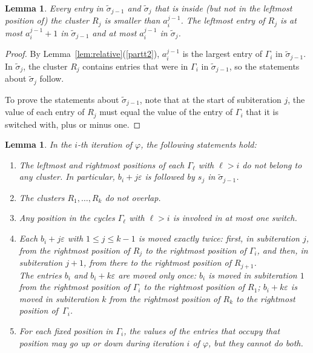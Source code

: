 \documentclass[11pt]{amsart}
\newtheorem{lemma}[theorem]{Lemma}
\newcommand\ben{\begin{enumerate}}
\newcommand\een{\end{enumerate}}
\newcommand\wt{\widetilde}
\newcommand\bij{\varphi}
\newcommand\eps{\varepsilon}
\newcommand\sigm{\wt\sigma}
\begin{document}
\begin{lemma}\label{lem:smaller}
Every entry in $\sigm_{j-1}$ and $\sigm_j$ that is inside (but not in the leftmost position of) the cluster $R_j$ is smaller than $a_i^{j-1}$.
The leftmost entry of $R_j$ is at most $a_i^{j-1}+1$ in $\sigm_{j-1}$ and at most $a_i^{j-1}$ in $\sigm_j$.
\end{lemma}

\begin{proof}
By Lemma~\ref{lem:relative}(\ref{partt2}), $a_i^{j-1}$ is the largest entry of $\Gamma_i$ in $\sigm_{j-1}$. In $\sigm_j$, the cluster $R_j$ contains entries that were
in $\Gamma_i$ in $\sigm_{j-1}$, so the statements about $\sigm_j$ follow.

To prove the statements about $\sigm_{j-1}$, note that at the start of subiteration $j$,
the value of each entry of $R_j$ must equal the value of the entry of $\Gamma_i$ that it is switched with, plus or minus one.
\end{proof}


\begin{lemma}\label{lem:clusters}
In the $i$-th iteration of $\bij$, the following statements hold:
\ben
\item\label{pd} The leftmost and rightmost positions of each $\Gamma_\ell$ with $\ell>i$ do not belong to any cluster. In particular, $b_i+j\eps$ is followed by $s_j$ in $\sigm_{j-1}$.
\item\label{pa} The clusters $R_1,\dots,R_k$ do not overlap.
\item\label{pb} Any position in the cycles $\Gamma_\ell$ with $\ell>i$ is involved in at most one switch.
\item\label{pc} Each $b_i+j\eps$ with $1\le j\le k-1$ is moved exactly twice: first, in subiteration $j$, from the rightmost position of $R_j$ to the rightmost position of $\Gamma_i$, and then,
in subiteration $j+1$, from there to the rightmost position of $R_{j+1}$.\\ 
The entries $b_i$ and $b_i+k\eps$ are moved only once: $b_i$ is moved in subiteration $1$ from the rightmost position of $\Gamma_i$ to the rightmost position of $R_1$;
$b_i+k\eps$ is moved in subiteration $k$ from the rightmost position of $R_k$ to the rightmost position of~$\Gamma_i$.
\item\label{pe} For each fixed position in $\Gamma_i$, the values of the entries that occupy that position may go up or down during iteration $i$ of $\bij$, but they cannot do both.
\een
\end{lemma}
\end{document}
